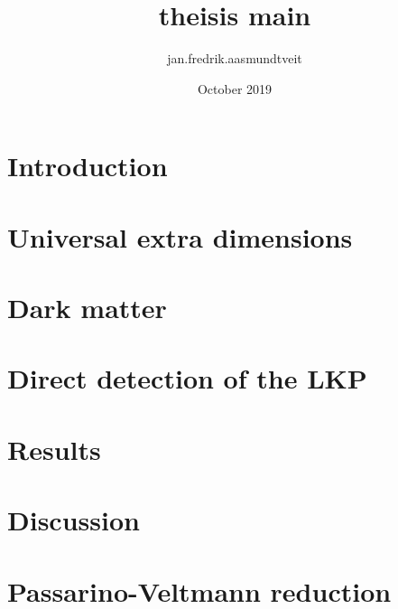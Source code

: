 \documentclass{article}
\title{theisis main}
\author{jan.fredrik.aasmundtveit }
\date{October 2019}
\begin{document}
\maketitle

\tableofcontents

\section{Introduction}


\section{Universal extra dimensions}


\section{Dark matter}


\section{Direct detection of the LKP}


\section {Results}



\section{Discussion}


\appendix

\section{Passarino-Veltmann reduction}


\nocite{*}


\end{document}
